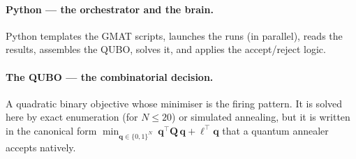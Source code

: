 \documentclass[11pt,a4paper]{article}
\theoremstyle{plain}
\begin{document}
\paragraph{Python --- the orchestrator and the brain.} Python templates the
GMAT scripts, launches the runs (in parallel), reads the results, assembles
the QUBO, solves it, and applies the accept/reject logic.

\paragraph{The QUBO --- the combinatorial decision.} A quadratic binary
objective whose minimiser is the firing pattern. It is solved here by exact
enumeration (for $N\!\le\!20$) or simulated annealing, but it is written in
the canonical form
$\min_{\bm q\in\{0,1\}^N}\ \bm q^\top \bm Q\,\bm q + \bm\ell^\top\bm q$
that a quantum annealer accepts natively.
\end{document}
